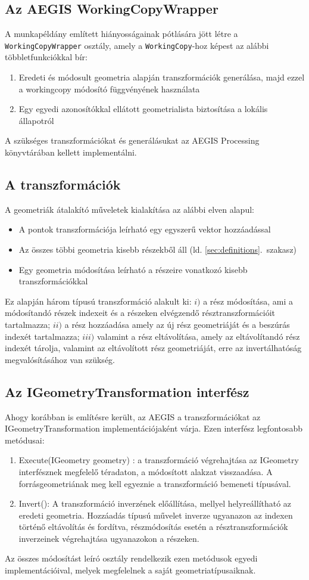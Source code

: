 \subsection{Az AEGIS WorkingCopyWrapper}
A munkapéldány említett hiányosságainak pótlására jött létre a \texttt{WorkingCopyWrapper} osztály, amely a \texttt{WorkingCopy}-hoz képest az alábbi többletfunkciókkal bír:
\begin{enumerate}
	\item Eredeti és módosult geometria alapján transzformációk generálása, majd ezzel a workingcopy módosító függvényének használata
	\item Egy egyedi azonosítókkal ellátott geometrialista biztosítása a lokális állapotról
\end{enumerate}
A szükséges transzformációkat és generálásukat az AEGIS Processing könyvtárában kellett implementálni.
\subsection{A transzformációk}
A geometriák átalakító műveletek kialakítása az alábbi elven alapul:
\begin{itemize}
	\item A pontok transzformációja leírható egy egyszerű vektor hozzáadással
	\item Az összes többi geometria kisebb részekből áll (ld. \ref{sec:definitions}.~szakasz)
	\item Egy geometria módosítása leírható a részeire vonatkozó kisebb transzformációkkal
\end{itemize}
Ez alapján három típusú transzformáció alakult ki: $i)$ a rész módosítása, ami a módosítandó részek indexeit és a részeken elvégzendő résztranszformációit tartalmazza; $ii)$ a rész hozzáadása amely az új rész geometriáját és a beszúrás indexét tartalmazza; $iii)$ valamint a rész eltávolítása, amely az eltávolítandó rész indexét tárolja, valamint az eltávolított rész geometriáját, erre az invertálhatóság megvalósításához van szükség.
\subsection{Az IGeometryTransformation interfész}
Ahogy korábban is említésre került, az AEGIS a transzformációkat az IGeometryTransformation implementációjaként várja. Ezen interfész legfontosabb metódusai:
\begin{enumerate}
	\item Execute(IGeometry geometry) : a transzformáció végrehajtása az IGeometry interfésznek megfelelő téradaton, a módosított alakzat visszaadása. A forrásgeometriának meg kell egyeznie a transzformáció bemeneti típusával.
	\item Invert(): A transzformáció inverzének előállítása, mellyel helyreállítható az eredeti geometria. Hozzáadás típusú művelet inverze ugyanazon az indexen történő eltávolítás és fordítva, részmódosítás esetén a résztranszformációk inverzeinek végrehajtása ugyanazokon a részeken.
\end{enumerate}
Az összes módosítást leíró osztály rendelkezik ezen metódusok egyedi implementációival, melyek megfelelnek a saját geometriatípusaiknak.
